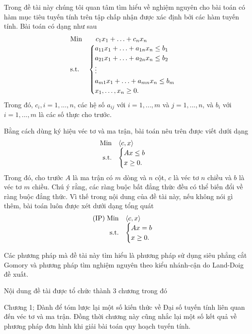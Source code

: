 \documentclass[12pt,a4paper]{report}
\begin{document}
Trong đề tài này chúng tôi quan tâm tìm hiểu về nghiệm nguyên cho bài toán có hàm mục tiêu tuyến tính trên tập chấp nhận được xác định bởi các hàm tuyến tính. Bài toán có dạng như sau
$$
\begin{array}{ll}
{\rm Min}&\quad c_1x_1+\ldots+c_nx_n\\
{\rm s.t.}&\begin{cases}
a_{11}x_1+\ldots+a_{1n}x_n \le b_1\\
a_{21}x_1+\ldots+a_{2n}x_n \le b_2\\
\vdots\\
a_{m1}x_1+\ldots+a_{mn}x_n \le b_m\\
x_1, \ldots, x_n \ge 0.
\end{cases}
\end{array}
$$
Trong đó, $c_i, i=1,...,n$, các hệ số $a_{ij}$ với $i=1,...,m$ và $j=1,...,n$, và $b_i$ với $i=1,...,m$ là các số thực cho trước.

Bằng cách dùng ký hiệu véc tơ và ma trận, bài toán nêu trên được viết dưới dạng 
$$
\begin{array}{rl}
{\rm Min}& \langle c,x \rangle \\
{\rm s.t.}& 
\begin{cases}Ax \le b\\
 x\ge 0.
 \end{cases}
\end{array}
$$
Trong đó, cho trước $A$ là ma trận có $m$ dòng và $n$ cột, $c$ là véc tơ $n$ chiều và $b$ là véc tơ $m$ chiều. Chú ý rằng, các ràng buộc bất đẳng thức đều có thể biến đổi về ràng buộc đẳng thức. Vì thế trong nội dung của đề tài này, nếu không nói gì thêm, bài toán luôn được xét dưới dạng tổng quát
$$
\begin{array}{rl}
{\rm (IP) \; Min}& \langle c,x \rangle \\
{\rm s.t.}& 
\begin{cases}Ax = b\\
 x\ge 0.
 \end{cases}
\end{array}
$$

Các phương pháp mà đề tài này tìm hiểu là phương pháp sử dụng siêu phẳng cắt Gomory và phương pháp tìm nghiệm nguyên theo kiểu nhánh-cận do Land-Doig đề xuất. 

Nội dung đề tài được tổ chức thành 3 chương trong đó 

Chương 1; Dành để tóm lược lại một số kiến thức về Đại số tuyến tính liên quan đến véc tơ và ma trận. Đồng thời chương này cũng nhắc lại một số kết quả về phương pháp đơn hình khi giải bài toán quy hoạch tuyến tính.
\end{document}
